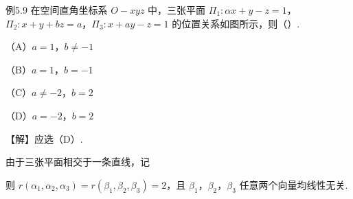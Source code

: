 \begin{fcard}{例5.9}
在空间直角坐标系 $O-xyz$ 中，三张平面 $\Pi_1:\alpha x+y-z=1$，$\Pi_2:x+y+bz=a$，$\Pi_3:x+ay-z=1$ 的位置关系如图所示，则（\quad）.

（A）$a=1$，$b\ne-1$

（B）$a=1$，$b=-1$

（C）$a\ne-2$，$b=2$

（D）$a=-2$，$b=2$



【解】应选（D）.

由于三张平面相交于一条直线，记



则 $r(\alpha_1,\alpha_2,\alpha_3)=r(\beta_1,\beta_2,\beta_3)=2$，且 $\beta_1$，$\beta_2$，$\beta_3$ 任意两个向量均线性无关.


\end{fcard}
